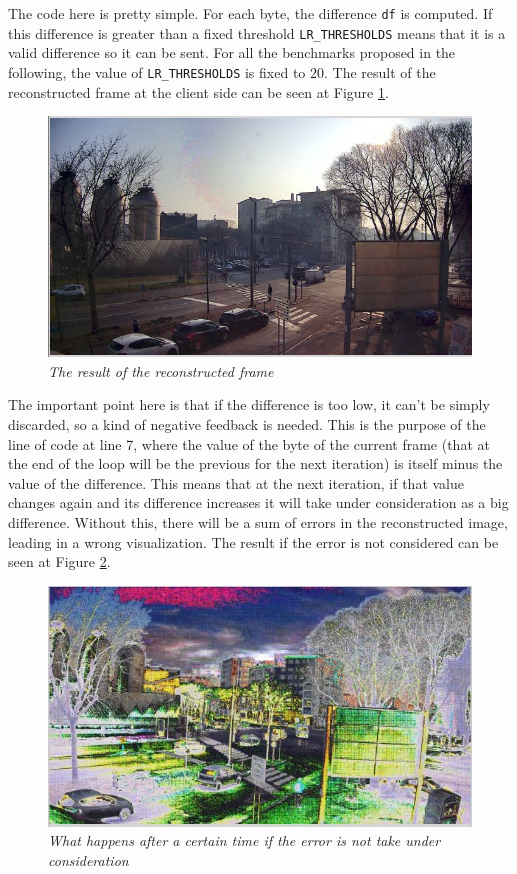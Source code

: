 \documentclass[paper=a4, fontsize=10pt]{scrartcl}	%
\begin{document}
	The code here is pretty simple. For each byte, the difference \texttt{df} is computed. If this difference is greater than a fixed threshold \texttt{LR\_THRESHOLDS} means that it is a valid difference so it can be sent. For all the benchmarks proposed in the following, the value of \texttt{LR\_THRESHOLDS} is fixed to $ 20 $. The result of the reconstructed frame at the client side can be seen at Figure \ref{fig:stream_ok}.\\

	\begin{figure}[H]
		\centering
		\includegraphics[width=0.7\linewidth]{images/streaming_ok2.png}
		\caption{\textit{The result of the reconstructed frame}}
		\label{fig:stream_ok}
	\end{figure}
	
	The important point here is that if the difference is too low, it can't be simply discarded, so a kind of negative feedback is needed. This is the purpose of the line of code at line 7, where the value of the byte of the current frame (that at the end of the loop will be the previous for the next iteration) is itself minus the value of the difference. This means that at the next iteration, if that value changes again and its difference increases it will take under consideration as a big difference. Without this, there will be a sum of errors in the reconstructed image, leading in a wrong visualization. The result if the error is not considered can be seen at Figure \ref{fig:stream_error}.
	
	\begin{figure}[H]
		\centering
		\includegraphics[width=0.7\linewidth]{images/streaming_differror.png}
		\caption{\textit{What happens after a certain time if the error is not take under consideration}}
		\label{fig:stream_error}
	\end{figure}
\end{document}
